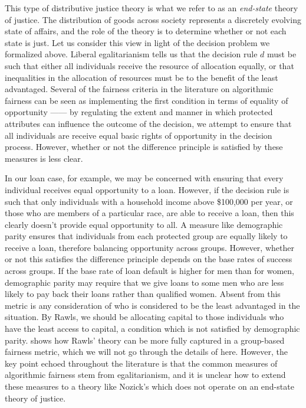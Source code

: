 This type of distributive justice theory is what we refer to as an
\textit{end-state} theory of justice. The distribution of goods across society
represents a discretely evolving state of affairs, and the role of the theory is
to determine whether or not each state is just. Let us consider this view in
light of the decision problem we formalized above. Liberal egalitarianism tells
us that the decision rule $d$ must be such that either all individuals receive
the resource of allocation equally, or that inequalities in the allocation of
resources must be to the benefit of the least advantaged. Several of the
fairness criteria in the literature on algorithmic fairness can be seen as
implementing the first condition in terms of equality of opportunity —— by 
regulating the extent and manner in which protected attributes can influence the
outcome of the decision, we attempt to ensure that all individuals are receive
equal basic rights of opportunity in the decision process. However, whether
or not the difference principle is satisfied by these measures is less clear.

In our loan case, for example, we may be concerned with ensuring that every
individual receives equal opportunity to a loan. However, if the decision rule
is such that only individuals with a household income above \$100,000 per year,
or those who are members of a particular race, are able to receive a loan, then
this clearly doesn't provide equal opportunity to all. A measure like
demographic parity ensures that individuals from each protected group are equally
likely to receive a loan, therefore balancing opportunity across groups. However,
whether or not this satisfies the difference principle depends on the base rates
of success across groups. If the base rate of loan default is higher for men
than for women, demographic parity may require that we give loans to some men
who are less likely to pay back their loans rather than qualified women. Absent
from this metric is any consideration of who is considered to be the least
advantaged in the situation. By Rawls, we should be allocating capital to those
individuals who have the least access to capital, a condition which is not
satisfied by demographic parity. \citep{Hertweck_2023} shows how Rawls' theory
can be more fully captured in a group-based fairness metric, which we will not
go through the details of here. However, the key point echoed throughout the
literature is that the common measures of algorithmic fairness stem from 
egalitarianism, and it is unclear how to extend these measures to a theory like Nozick's
which does not operate on an end-state theory of justice.
